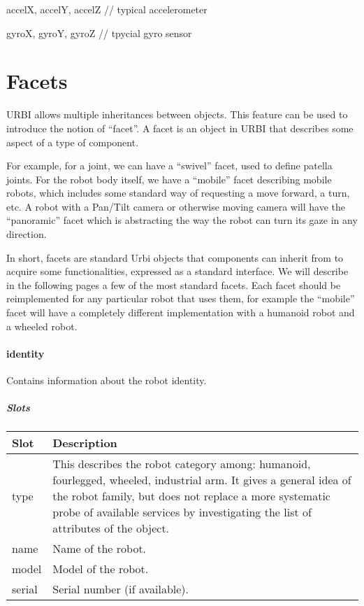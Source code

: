 \documentclass[a4paper]{article}
\begin{document}
{
accelX, accelY, accelZ // typical accelerometer}

{
gyroX, gyroY, gyroZ // tpycial gyro sensor}

\section[]{}
\section[Facets]{Facets}

URBI allows multiple inheritances between objects. This feature can be
used to introduce the notion of “facet”. A facet is an object in URBI
that describes some aspect of a type of component.


For example, for a joint, we can have a “swivel” facet, used to define
patella joints. For the robot body itself, we have a “mobile” facet
describing mobile robots, which includes some standard way of
requesting a move forward, a turn, etc. A robot with a Pan/Tilt camera
or otherwise moving camera will have the “panoramic” facet which is
abstracting the way the robot can turn its gaze in any direction.


In short, facets are standard Urbi objects that components can inherit
from to acquire some functionalities, expressed as a standard
interface. We will describe in the following pages a few of the most
standard facets. Each facet should be reimplemented for any particular
robot that uses them, for example the “mobile” facet will have a
completely different implementation with a humanoid robot and a wheeled
robot.

\paragraph{identity}


Contains information about the robot identity.

\subparagraph{Slots}

\begin{flushleft}
\tablehead{}
\begin{supertabular}{|m{2.8669999cm}|m{12.472cm}|}
\hline
\sffamily\bfseries Slot &
\sffamily\bfseries Description\\\hline
type &
\sffamily This describes the robot category
among: humanoid, fourlegged, wheeled, industrial arm. It gives a
general idea of the robot family, but does not replace a more
systematic probe of available services by investigating the list of
attributes of the object.\\\hline
name &
\sffamily Name of the robot.\\\hline
model &
\sffamily Model of the robot.\\\hline
serial &
\sffamily Serial number (if available).\\\hline
\end{supertabular}
\end{flushleft}
\end{document}
